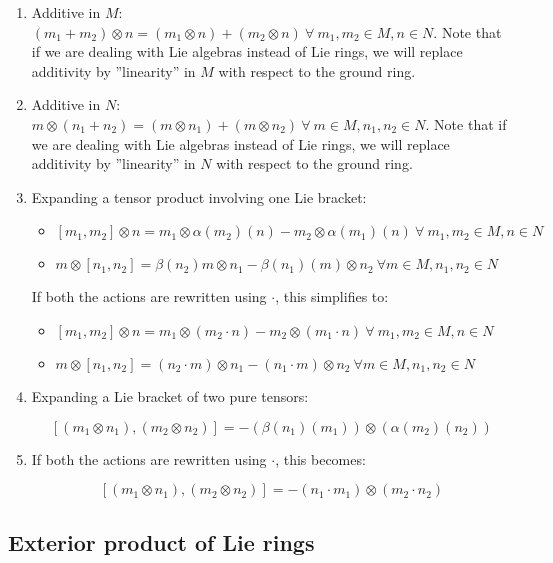 \begin{enumerate}
\item Additive in $M$: $(m_1 + m_2) \otimes n = (m_1 \otimes n) + (m_2
  \otimes n) \ \forall \ m_1,m_2 \in M, n \in N$. Note that if we are
  dealing with Lie algebras instead of Lie rings, we will replace
  additivity by ''linearity'' in $M$ with respect to the ground ring.
\item Additive in $N$: $m \otimes (n_1 + n_2) = (m \otimes n_1) + (m \otimes n_2) \ \forall \ m \in M, n_1,n_2 \in N$. Note that if we are dealing with Lie algebras instead of Lie rings, we will replace additivity by ''linearity'' in $N$ with respect to the ground ring.
\item Expanding a tensor product involving one Lie bracket: 
  \begin{itemize}
  \item $[m_1,m_2] \otimes n = m_1 \otimes \alpha(m_2)(n) - m_2 \otimes
    \alpha(m_1)(n) \ \forall \ m_1,m_2 \in M, n \in N$
  \item $m \otimes [n_1,n_2] = \beta(n_2)m \otimes n_1 - \beta(n_1)(m)
    \otimes n_2 \ \forall m \in M, n_1,n_2 \in N$
  \end{itemize}
  If both the actions are rewritten using $\cdot$, this simplifies to:
  
  \begin{itemize}
  \item $[m_1,m_2] \otimes n = m_1 \otimes (m_2 \cdot n) - m_2 \otimes (m_1 \cdot n) \ \forall \ m_1,m_2 \in M, n \in N$
  \item $m \otimes [n_1,n_2] = (n_2 \cdot m) \otimes n_1 - (n_1 \cdot m) \otimes n_2 \ \forall m \in M, n_1,n_2 \in N$
  \end{itemize}
\item Expanding a Lie bracket of two pure tensors:

  $$[(m_1 \otimes n_1),(m_2 \otimes n_2)] = -(\beta(n_1)(m_1)) \otimes (\alpha(m_2)(n_2))$$
\item If both the actions are rewritten using $\cdot$, this becomes:

  $$[(m_1 \otimes n_1),(m_2 \otimes n_2)] = -(n_1 \cdot m_1) \otimes (m_2 \cdot n_2)$$
\end{enumerate}

\subsection{Exterior product of Lie rings}\label{sec:exteriorsquare-explicit-lie}

